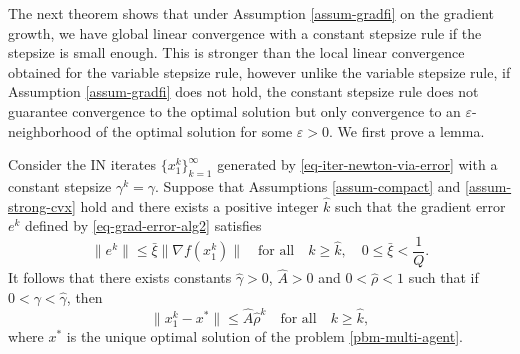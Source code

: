 \documentclass[final,numbook]{svjour3}
\begin{document}
The next theorem shows that under Assumption \ref{assum-gradfi} on the gradient growth,
we have global linear convergence with a constant stepsize rule if the stepsize is small enough. This is stronger than the local linear convergence obtained for the variable stepsize rule, however unlike the variable stepsize rule, if Assumption \ref{assum-gradfi} does not hold, the constant stepsize rule does not guarantee convergence to the optimal solution but only convergence to an $\varepsilon$-neighborhood of the optimal solution for some $\varepsilon>0$. We first prove a lemma.
\begin{lemma}\label{lemm-global-lin-conv-constant-step} Consider the IN iterates $\{x_1^k\}_{k=1}^\infty$ generated by \eqref{eq-iter-newton-via-error} with a constant stepsize $\gamma^k =\gamma$. Suppose that Assumptions \ref{assum-compact} and \ref{assum-strong-cvx} hold and there exists a positive integer ${\hat{k}}$ such that the gradient error $e^k$ defined by \eqref{eq-grad-error-alg2} satisfies
  \begin{equation}\label{bound-grad-error-relative} \|e^k\| \leq {{\bar{\xi}}} \| \nabla f(x_1^k) \| \quad \mbox{for all} \quad k \geq {\hat{k}}, \quad 0 \leq {{\bar{\xi}}} < \frac{1}{Q}. \end{equation}
It follows that there exists constants ${\hat{\gamma}}>0$, ${\hat{A}} > 0$ and $0<{\hat{\rho}}<1$ such that if $0<\gamma<{\hat{\gamma}}$, then
   \begin{equation}\label{ineq-lin-conv-constants} \|x_1^k - x^*\| \leq {\hat{A}} {\hat{\rho}} ^k \quad \mbox{for all} \quad k \geq {\hat{k}},
   \end{equation}
where $x^*$ is the unique optimal solution of the problem \eqref{pbm-multi-agent}.
\end{lemma}
\end{document}
